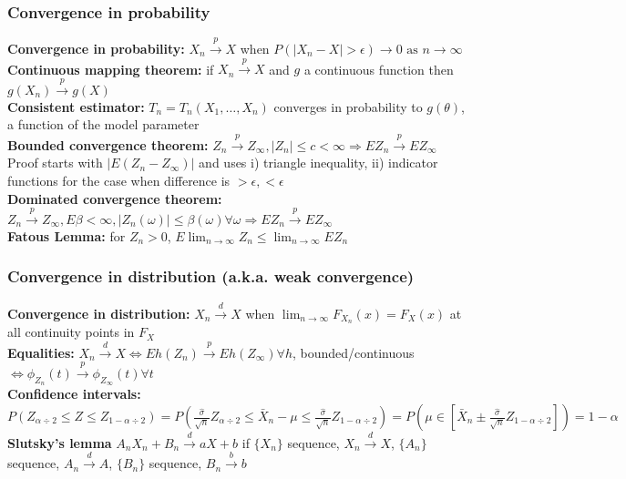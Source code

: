\documentclass{article}
\newcommand{\abs}[1]{\lvert#1\rvert}
\begin{document}
\subsubsection{Convergence in probability}
\textbf{Convergence in probability: } $X_n \overset{p}{\longrightarrow} X$ when $P(\abs{X_n - X} > \epsilon) \longrightarrow 0 \textrm{ as } n \longrightarrow \infty$\\
\textbf{Continuous mapping theorem: } if $X_n \overset{p}{\longrightarrow} X$ and $g$ a continuous function then $g(X_n) \overset{p}{\longrightarrow} g(X)$\\
\textbf{Consistent estimator:} $T_n = T_n(X_1, \dots, X_n)$ converges in probability to $g(\theta)$, a function of the model parameter\\
\textbf{Bounded convergence theorem:} $Z_n \overset{p}{\longrightarrow} Z_\infty, \abs{Z_n} \leq c < \infty \Longrightarrow EZ_n \overset{p}{\longrightarrow} EZ_\infty$\\
Proof starts with $\abs{E(Z_n - Z_\infty)}$ and uses i) triangle inequality, ii) indicator functions for the case when difference is $>\epsilon, <\epsilon$\\
\textbf{Dominated convergence theorem:} $Z_n \overset{p}{\longrightarrow} Z_\infty, E\beta < \infty, \abs{Z_n(\omega)} \leq \beta(\omega) \forall \omega \Longrightarrow EZ_n \overset{p}{\longrightarrow} EZ_\infty$\\
\textbf{Fatous Lemma: } for $Z_n > 0$, $E\lim_{n \rightarrow \infty} Z_n \leq \lim_{n \rightarrow \infty} E Z_n$

\subsubsection{Convergence in distribution (a.k.a. weak convergence)}
\textbf{Convergence in distribution: } $X_n \overset{d}{\longrightarrow} X$ when $\lim_{n\longrightarrow \infty} F_{X_n}(x) = F_X(x)$ at all continuity points in $F_X$\\
\textbf{Equalities: } $X_n \overset{d}{\longrightarrow} X \Longleftrightarrow Eh(Z_n) \overset{p}{\longrightarrow} Eh(Z_\infty) \forall h$, bounded/continuous $\Longleftrightarrow \phi_{Z_n}(t) \overset{p}{\longrightarrow} \phi_{Z_\infty}(t) \forall t$\\
\textbf{Confidence intervals: } $P(Z_{\alpha \div 2} \leq Z \leq Z_{1-\alpha \div 2}) = P(\frac{\hat{\sigma}}{\sqrt{n}}Z_{\alpha \div 2} \leq \bar{X}_n - \mu \leq \frac{\hat{\sigma}}{\sqrt{n}}Z_{1-\alpha \div 2}) = P(\mu \in \left[\bar{X}_n \pm \frac{\hat{\sigma}}{\sqrt{n}}Z_{1-\alpha \div 2}\right]) = 1-\alpha$\\
\textbf{Slutsky's lemma}
$A_nX_n + B_n \overset{d}{\rightarrow} aX + b$ if $\{X_n\}$ sequence, $X_n \overset{d}{\rightarrow} X$,  $\{A_n\}$ sequence, $A_n \overset{d}{\rightarrow} A$, $\{B_n\}$ sequence, $B_n \overset{b}{\rightarrow} b$
\end{document}

